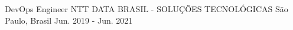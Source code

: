 \begin{cventries}
  \cventry
    {DevOps Engineer} %
    {NTT DATA BRASIL - SOLUÇÕES TECNOLÓGICAS} %
    {São Paulo, Brasil} %
    {Jun. 2019 - Jun. 2021} %
    {
      \begin{cvitems} %
      \end{cvitems}
    }
\end{cventries}
